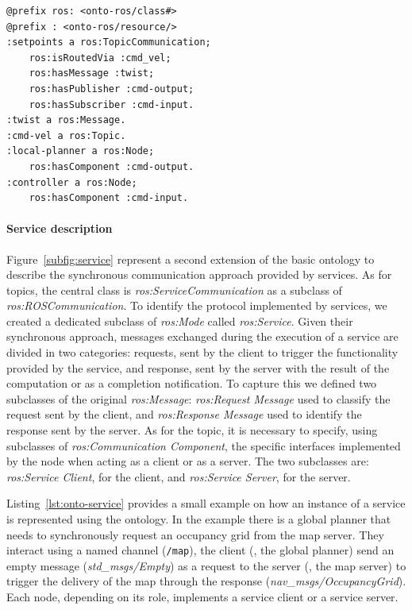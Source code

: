 \begin{lstlisting}[frame=tb,caption={TODO},label=lst:onto-topic]
@prefix ros: <onto-ros/class#>
@prefix : <onto-ros/resource/>
:setpoints a ros:TopicCommunication;
	ros:isRoutedVia :cmd_vel;
	ros:hasMessage :twist;
	ros:hasPublisher :cmd-output;
	ros:hasSubscriber :cmd-input.
:twist a ros:Message.
:cmd-vel a ros:Topic.  
:local-planner a ros:Node;
	ros:hasComponent :cmd-output.
:controller a ros:Node;
	ros:hasComponent :cmd-input.
 \end{lstlisting}

\paragraph{Service description} Figure~\ref{subfig:service} represent a second extension of the basic ontology to describe the synchronous communication approach provided by services.  As for topics, the central class is \textit{ros:Service\-Com\-mu\-ni\-ca\-tion} as a subclass of \textit{ros:ROS\-Com\-mu\-ni\-ca\-tion}. To identify the protocol implemented by services, we created a dedicated subclass of \textit{ros:Mode} called \textit{ros:Service}. Given their
synchronous approach, messages exchanged during the execution of a service are divided in two categories: requests, sent by the client to trigger the functionality provided by the service, and response, sent by the server with the result of the computation or as a completion notification. To capture this we defined two subclasses of the original \textit{ros:Message}: \textit{ros:Request Message} used to classify the request sent by the client, and \textit{ros:Response Message} used to identify the response sent by the server. As for the topic, it is necessary to specify, using subclasses of \textit{ros:Communication Component}, the specific interfaces implemented by the node when acting as a client or as a server. The two subclasses are: \textit{ros:Service Client}, for the client, and \textit{ros:Service Server}, for the server.

Listing~\ref{lst:onto-service} provides a small example on how an instance of a service is represented using the ontology. In the example there is a global planner that needs to synchronously request an occupancy grid from the map server. They interact using a named channel (\texttt{/map}), the client (\ie, the global planner) send an empty message (\textit{std\_msgs/Empty}) as a request to the server (\ie, the map server) to trigger the delivery of the map through the response (\textit{nav\_msgs/OccupancyGrid}). Each node, depending on its role, implements a service client or a service server.

